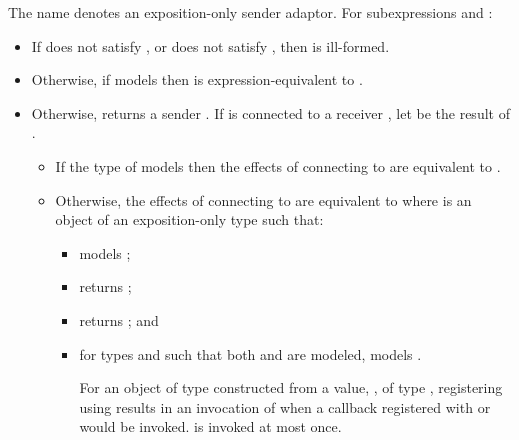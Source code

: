 \pnum
The name  denotes an exposition-only sender adaptor.
For subexpressions  and :
\begin{itemize}
\item
If  does not satisfy , or
does not satisfy ,
then  is ill-formed.

\item
Otherwise,
if  models
 then
 is expression-equivalent to
.

\item
Otherwise,
 returns a sender .
If  is connected to a receiver ,
let  be the result of .

\begin{itemize}
\item
If the type of  models  then
the effects of connecting  to 
are equivalent to
.

\item
Otherwise,
the effects of connecting  to 
are equivalent to
where  is an object of
an exposition-only type  such that:
  \begin{itemize}
  \item
   models ;
  \item
   returns
  ;
  \item
   returns
  ; and
  \item
  for types  and  such that both
   and
  are modeled,
   models
  .
  \begin{tailnote}
  For an object  of type 
  constructed from a value, , of type ,
  registering  using
  results in an invocation of  when
  a callback registered with  or  would be invoked.
   is invoked at most once.
  \end{tailnote}
  \end{itemize}
\end{itemize}
\end{itemize}

